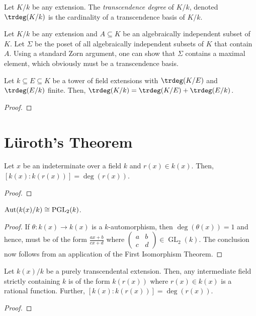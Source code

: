 \begin{definition}
    Let $K/k$ be any extension. The \emph{transcendence degree} of $K/k$, denoted $\trdeg(K/k)$ is the cardinality of a transcendence basis of $K/k$.
\end{definition}

\begin{remark}
    Let $K/k$ be any extension and $A\subseteq K$ be an algebraically independent subset of $K$. Let $\Sigma$ be the poset of all algebraically independent subsets of $K$ that contain $A$. Using a standard Zorn argument, one can show that $\Sigma$ contains a maximal element, which obviously must be a transcendence basis.
\end{remark}

\begin{theorem}
    Let $k\subseteq E\subseteq K$ be a tower of field extensions with $\trdeg(K/E)$ and $\trdeg(E/k)$ finite. Then, $\trdeg(K/k) = \trdeg(K/E) + \trdeg(E/k)$.
\end{theorem}
\begin{proof}
\end{proof}

\section{L\"uroth's Theorem}

\begin{lemma}
    Let $x$ be an indeterminate over a field $k$ and $r(x)\in k(x)$. Then, $[k(x):k(r(x))] = \deg(r(x))$.
\end{lemma}
\begin{proof}
\end{proof}

\begin{theorem}
    $\operatorname{Aut}(k(x)/k)\cong\operatorname{PGL}_2(k)$.
\end{theorem}
\begin{proof}
    If $\theta: k(x)\to k(x)$ is a $k$-automorphism, then $\deg(\theta(x)) = 1$ and hence, must be of the form $\frac{ax + b}{cx + d}$ where $\begin{pmatrix}a & b\\c & d\end{pmatrix}\in\operatorname{GL}_2(k)$. The conclusion now follows from an application of the First Isomorphism Theorem.
\end{proof}

\begin{theorem}
    Let $k(x)/k$ be a purely transcendental extension. Then, any intermediate field strictly containing $k$ is of the form $k(r(x))$ where $r(x)\in k(x)$ is a rational function. Further, $[k(x):k(r(x))] = \deg(r(x))$.
\end{theorem}
\begin{proof}
\end{proof}

